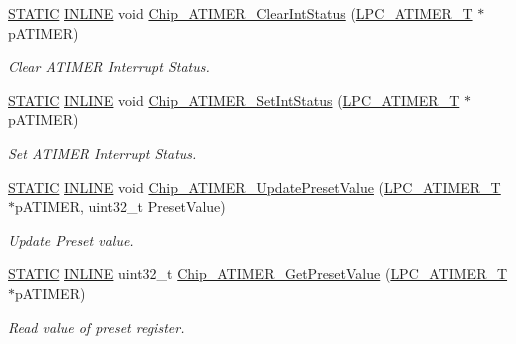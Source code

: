 \begin{DoxyCompactItemize}
\hyperlink{group___l_p_c___types___public___macros_ga10b2d890d871e1489bb02b7e70d9bdfb}{S\+T\+A\+T\+IC} \hyperlink{spifi__18xx__43xx_8h_a2eb6f9e0395b47b8d5e3eeae4fe0c116}{I\+N\+L\+I\+NE} void \hyperlink{group___a_t_i_m_e_r__18_x_x__43_x_x_ga0572abacb9a1995bc71b9d94f3e4bd93}{Chip\+\_\+\+A\+T\+I\+M\+E\+R\+\_\+\+Clear\+Int\+Status} (\hyperlink{struct_l_p_c___a_t_i_m_e_r___t}{L\+P\+C\+\_\+\+A\+T\+I\+M\+E\+R\+\_\+T} $\ast$p\+A\+T\+I\+M\+ER)
\begin{DoxyCompactList}\small\item\em Clear A\+T\+I\+M\+ER Interrupt Status. \end{DoxyCompactList}\item 
\hyperlink{group___l_p_c___types___public___macros_ga10b2d890d871e1489bb02b7e70d9bdfb}{S\+T\+A\+T\+IC} \hyperlink{spifi__18xx__43xx_8h_a2eb6f9e0395b47b8d5e3eeae4fe0c116}{I\+N\+L\+I\+NE} void \hyperlink{group___a_t_i_m_e_r__18_x_x__43_x_x_gab14af39f45e3b5c3e029d653476142db}{Chip\+\_\+\+A\+T\+I\+M\+E\+R\+\_\+\+Set\+Int\+Status} (\hyperlink{struct_l_p_c___a_t_i_m_e_r___t}{L\+P\+C\+\_\+\+A\+T\+I\+M\+E\+R\+\_\+T} $\ast$p\+A\+T\+I\+M\+ER)
\begin{DoxyCompactList}\small\item\em Set A\+T\+I\+M\+ER Interrupt Status. \end{DoxyCompactList}\item 
\hyperlink{group___l_p_c___types___public___macros_ga10b2d890d871e1489bb02b7e70d9bdfb}{S\+T\+A\+T\+IC} \hyperlink{spifi__18xx__43xx_8h_a2eb6f9e0395b47b8d5e3eeae4fe0c116}{I\+N\+L\+I\+NE} void \hyperlink{group___a_t_i_m_e_r__18_x_x__43_x_x_gae0b0e01b311f6a0ee48c3f518ed2b4cc}{Chip\+\_\+\+A\+T\+I\+M\+E\+R\+\_\+\+Update\+Preset\+Value} (\hyperlink{struct_l_p_c___a_t_i_m_e_r___t}{L\+P\+C\+\_\+\+A\+T\+I\+M\+E\+R\+\_\+T} $\ast$p\+A\+T\+I\+M\+ER, uint32\+\_\+t Preset\+Value)
\begin{DoxyCompactList}\small\item\em Update Preset value. \end{DoxyCompactList}\item 
\hyperlink{group___l_p_c___types___public___macros_ga10b2d890d871e1489bb02b7e70d9bdfb}{S\+T\+A\+T\+IC} \hyperlink{spifi__18xx__43xx_8h_a2eb6f9e0395b47b8d5e3eeae4fe0c116}{I\+N\+L\+I\+NE} uint32\+\_\+t \hyperlink{group___a_t_i_m_e_r__18_x_x__43_x_x_ga0bb6a4c4ff315c739c697ac023494619}{Chip\+\_\+\+A\+T\+I\+M\+E\+R\+\_\+\+Get\+Preset\+Value} (\hyperlink{struct_l_p_c___a_t_i_m_e_r___t}{L\+P\+C\+\_\+\+A\+T\+I\+M\+E\+R\+\_\+T} $\ast$p\+A\+T\+I\+M\+ER)
\begin{DoxyCompactList}\small\item\em Read value of preset register. \end{DoxyCompactList}\end{DoxyCompactItemize}


